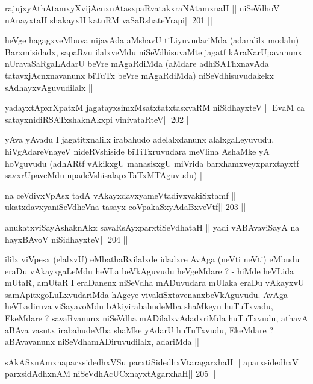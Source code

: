 \begin{shl}
rajujxyAthAtamxyXvijAcnxnAtasxpaRvatakxraNAtamxnaH ||
niSeVdhoV nAnayxtaH shakayxH katuRM vaSaRshateYrapi\hfill || 201  ||
\end{shl}

\begin{artha}
heVge hagagxveMbuva nijavAda aMshavU tiLiyuvudariMda (adaralilx
modalu) Barxmisidadx, sapaRvu ilalxveMdu niSeVdhisuvaMte jagatf
kAraNarUpavanunx nUravaSaRgaLAdarU beVre mAgaRdiMda (aMdare
adhiSAThxnavAda tatavxjAcnxnavanunx biTuTx beVre mAgaRdiMda)
niSeVdhisuvudakekx sAdhayxvAguvudilalx ||
\end{artha}

\begin{shl}
yadayxtApxrXpatxM jagatayxsimxMsatxtatxtasxvaRM niSidhayxteV ||
EvaM ca satayxnidiRSATxshaknAkx\s pi vinivataRteV\hfill || 202 ||
\end{shl}

\begin{artha}
yAva yAvadu I jagatitxnalilx irabahudo adelalxdanunx alalxgaLeyuvudu,
hiVgAdareVnayeV nideRVshiside biTiTxruvudara meVlina AshaMke yA
hoVguvudu (adhARtf vAkikxgU manasisxgU miVrida barxhamxveyxparxtayxtf
savxrUpaveMdu upadeVshisalapxTaTxMTAguvudu) ||
\end{artha}

\begin{shl}
na ceVdivxVpAsx tadA vAkayxdavxyameVtadivxvakiSxtamf ||
ukatxdavxyaniSeVdheVna tasayx coVpakaSxyAdaBxveVtf\hfill || 203 ||
\end{shl}

\begin{shl}
anukatxviSayAshaknAkx savaRsAyxparxtiSeVdhataH ||
yadi vA\s BAvaviSayA na hayxBAvoV niSidhayxteV\hfill || 204 ||
\end{shl}

\begin{artha}
ililx viVpesx (elalxvU) eMbathaRvilalxde idadxre AvAga (neVti neVti)
eMbudu eraDu vAkayxgaLeMdu heVLa beVkAguvudu heVgeMdare ? - hiMde
heVLida mUtaR, amUtaR I eraDanenx niSeVdha mADuvudara mUlaka eraDu
vAkayxvU samApitxgoLuLxvudariMda hAgeye
vivakiSxtavenanxbeVkAguvudu. AvAga heVLadiruva viSayavoMdu
bAkiyirabahudeMba shaMkeyu huTuTxvadu, EkeMdare ? savaRvanunx niSeVdha
mADilalxvAdadxriMda huTuTxvudu, athavA aBAva vasutx irabahudeMba
shaMke yAdarU huTuTxvudu, EkeMdare ? aBAvavanunx
niSeVdhamADiruvudilalx, adariMda ||
\end{artha}

\begin{shl}
sAkASxnAmxnaparxsidedhxVSu parxtiSidedhxVtaragarxhaH ||
aparxsidedhxV parxsidAdhxnAM niSeVdhAcUCxnayxtAgarxhaH\hfill || 205 ||
\end{shl}

